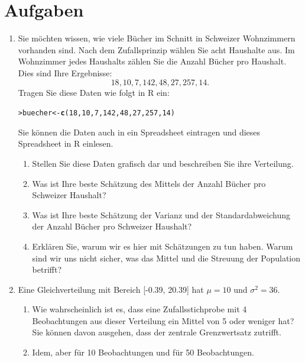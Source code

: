 \documentclass[oneside, 10pt]{book}\usepackage[]{graphicx}\usepackage[]{xcolor}
\makeatletter
\newcommand{\hlnum}[1]{\textcolor[rgb]{0.686,0.059,0.569}{#1}}%
\newcommand{\hlstd}[1]{\textcolor[rgb]{0.345,0.345,0.345}{#1}}%
\newcommand{\hlkwb}[1]{\textcolor[rgb]{0.69,0.353,0.396}{#1}}%
\newcommand{\hlkwd}[1]{\textcolor[rgb]{0.737,0.353,0.396}{\textbf{#1}}}%
\newenvironment{kframe}{%
 \def\at@end@of@kframe{}%
 \ifinner\ifhmode%
  \def\at@end@of@kframe{\end{minipage}}%
  \begin{minipage}{\columnwidth}%
 \fi\fi%
 \def\FrameCommand##1{\hskip\@totalleftmargin \hskip-\fboxsep
 \colorbox{shadecolor}{##1}\hskip-\fboxsep
     \hskip-\linewidth \hskip-\@totalleftmargin \hskip\columnwidth}%
 \MakeFramed {\advance\hsize-\width
   \@totalleftmargin\z@ \linewidth\hsize
   \@setminipage}}%
 {\par\unskip\endMakeFramed%
 \at@end@of@kframe}
\newenvironment{knitrout}{}{} %
\makeatother
\begin{document}
\section{Aufgaben}
\begin{enumerate}
\item Sie möchten wissen, wie viele Bücher im Schnitt
in Schweizer Wohnzimmern vorhanden sind. Nach dem Zufallsprinzip
wählen Sie acht Haushalte aus. Im Wohnzimmer jedes Haushalts zählen
Sie die Anzahl Bücher pro Haushalt. Dies sind Ihre Ergebnisse:
\[
  18, 10, 7, 142, 48, 27, 257, 14.
\]
Tragen Sie diese Daten wie folgt in R ein:
\begin{knitrout}
\color{fgcolor}\begin{kframe}
\begin{alltt}
\hlstd{> }\hlstd{buecher} \hlkwb{<-} \hlkwd{c}\hlstd{(}\hlnum{18}\hlstd{,} \hlnum{10}\hlstd{,} \hlnum{7}\hlstd{,} \hlnum{142}\hlstd{,} \hlnum{48}\hlstd{,} \hlnum{27}\hlstd{,} \hlnum{257}\hlstd{,} \hlnum{14}\hlstd{)}
\end{alltt}
\end{kframe}
\end{knitrout}
Sie können die Daten auch in ein Spreadsheet eintragen und dieses Spreadsheet in R einlesen.
\begin{enumerate}
\item Stellen Sie diese Daten grafisch dar und beschreiben Sie ihre Verteilung.
\item Was ist Ihre beste Schätzung des Mittels der Anzahl Bücher pro Schweizer Haushalt?
\item Was ist Ihre beste Schätzung der Varianz und der Standardabweichung der Anzahl Bücher pro Schweizer Haushalt?
\item Erklären Sie, warum wir es hier mit Schätzungen zu tun haben.
      Warum sind wir uns nicht sicher, was das Mittel und die Streuung der Population betrifft?
\end{enumerate}

\item Eine Gleichverteilung mit Bereich [-0.39, 20.39] hat $\mu = 10$ und $\sigma^2 = 36$.

\begin{enumerate}
\item Wie wahrscheinlich ist es, dass eine Zufallsstichprobe mit 4
Beobachtungen aus dieser Verteilung ein Mittel von 5 oder weniger hat? Sie können davon ausgehen,
dass der zentrale Grenzwertsatz zutrifft.

\item Idem, aber für 10 Beobachtungen und für 50 Beobachtungen.


\end{enumerate}
\end{enumerate}
\end{document}
